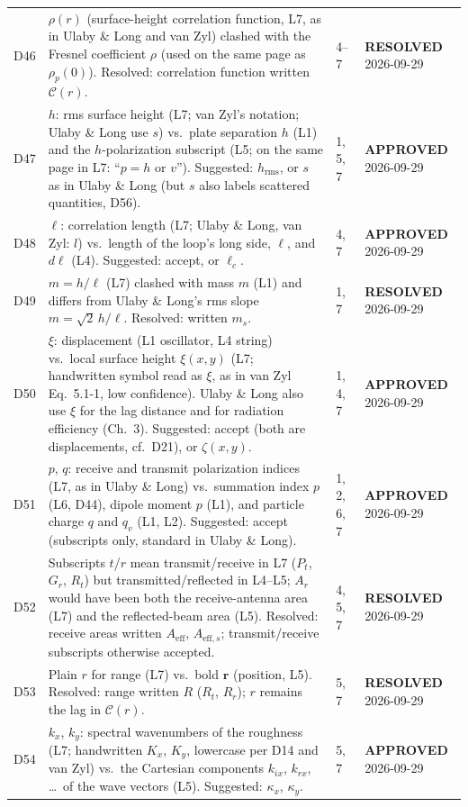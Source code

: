 \documentclass[11pt, oneside]{article}
\newcommand{\approved}{\textbf{APPROVED}}
\newcommand{\resolved}{\textbf{RESOLVED}}
\begin{document}
\begin{longtable}{l >{\raggedright\arraybackslash}p{} l l}
D46 & $\rho(r)$ (surface-height correlation function, L7, as in Ulaby \& Long and van Zyl) clashed with the Fresnel coefficient $\rho$ (used on the same page as $\rho_p(0)$). Resolved: correlation function written $\mathcal{C}(r)$. & 4--7 & \resolved{} 2026-09-29 \\
D47 & $h$: rms surface height (L7; van Zyl's notation; Ulaby \& Long use $s$) vs.\ plate separation $h$ (L1) and the $h$-polarization subscript (L5; on the same page in L7: ``$p = h$ or $v$''). Suggested: $h_\mathrm{rms}$, or $s$ as in Ulaby \& Long (but $s$ also labels scattered quantities, D56). & 1, 5, 7 & \approved{} 2026-09-29 \\
D48 & $\ell$: correlation length (L7; Ulaby \& Long, van Zyl: $l$) vs.\ length of the loop's long side, $\ell$, and $d\boldsymbol{\ell}$ (L4). Suggested: accept, or $\ell_c$. & 4, 7 & \approved{} 2026-09-29 \\
D49 & $m = h/\ell$ (L7) clashed with mass $m$ (L1) and differs from Ulaby \& Long's rms slope $m = \sqrt2\,h/\ell$. Resolved: written $m_s$. & 1, 7 & \resolved{} 2026-09-29 \\
D50 & $\xi$: displacement (L1 oscillator, L4 string) vs.\ local surface height $\xi(x,y)$ (L7; handwritten symbol read as $\xi$, as in van Zyl Eq.~5.1-1, low confidence). Ulaby \& Long also use $\xi$ for the lag distance and for radiation efficiency (Ch.~3). Suggested: accept (both are displacements, cf.\ D21), or $\zeta(x,y)$. & 1, 4, 7 & \approved{} 2026-09-29 \\
D51 & $p$, $q$: receive and transmit polarization indices (L7, as in Ulaby \& Long) vs.\ summation index $p$ (L6, D44), dipole moment $p$ (L1), and particle charge $q$ and $q_v$ (L1, L2). Suggested: accept (subscripts only, standard in Ulaby \& Long). & 1, 2, 6, 7 & \approved{} 2026-09-29 \\
D52 & Subscripts $t$/$r$ mean transmit/receive in L7 ($P_t$, $G_r$, $R_t$) but transmitted/reflected in L4--L5; $A_r$ would have been both the receive-antenna area (L7) and the reflected-beam area (L5). Resolved: receive areas written $A_\mathrm{eff}$, $A_{\mathrm{eff},s}$; transmit/receive subscripts otherwise accepted. & 4, 5, 7 & \resolved{} 2026-09-29 \\
D53 & Plain $r$ for range (L7) vs.\ bold $\mathbf{r}$ (position, L5). Resolved: range written $R$ ($R_t$, $R_r$); $r$ remains the lag in $\mathcal{C}(r)$. & 5, 7 & \resolved{} 2026-09-29 \\
D54 & $k_x$, $k_y$: spectral wavenumbers of the roughness (L7; handwritten $K_x$, $K_y$, lowercase per D14 and van Zyl) vs.\ the Cartesian components $k_{ix}$, $k_{rx}$, \ldots\ of the wave vectors (L5). Suggested: $\kappa_x$, $\kappa_y$. & 5, 7 & \approved{} 2026-09-29 \\

\end{longtable}
\end{document}
